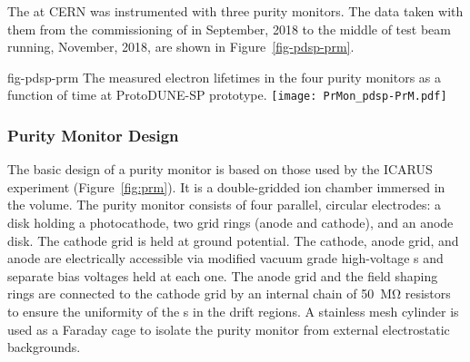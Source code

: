 




The  at CERN was instrumented with three purity monitors. The data taken with them from the commissioning of  in September, 2018 to the middle of test beam running, November, 2018, are shown in Figure~\ref{fig-pdsp-prm}. 

\begin{dunefigure}{fig-pdsp-prm}
  {The measured electron lifetimes in the four purity monitors as a function of time at ProtoDUNE-SP prototype.}
  \texttt{[image: PrMon\_pdsp-PrM.pdf]}
\end{dunefigure}




\subsubsection{Purity Monitor Design}

The basic design of a purity monitor is based on those used by the ICARUS experiment (Figure~\ref{fig:prm})\cite{Adamowski:2014daa}. It is a double-gridded ion chamber immersed in the \lar volume.   The purity monitor consists of four parallel, circular electrodes: a disk holding a photocathode, two grid rings (anode and cathode), and an anode disk. The cathode grid is held at ground potential. The cathode, anode grid, and anode are electrically accessible via modified vacuum grade high-voltage \fdth{}s and separate bias voltages held at each one.  
The anode grid and the field shaping rings are connected to the cathode grid by an internal chain of \SI{50}{\mega\ohm} resistors to ensure the uniformity of the \efield{}s in the drift regions. A stainless mesh cylinder is used as a Faraday cage to isolate the purity monitor from external electrostatic backgrounds. 

